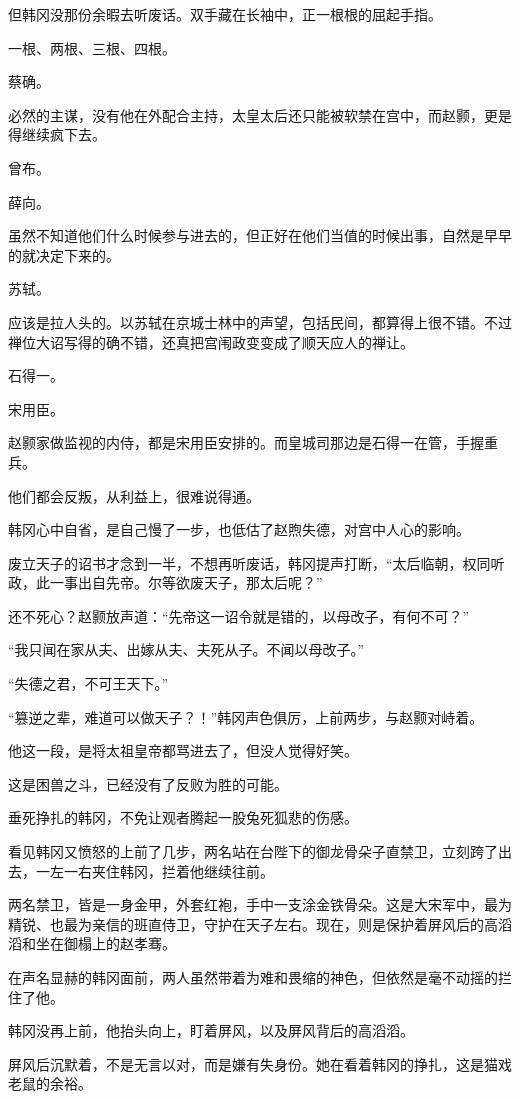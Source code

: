 但韩冈没那份余暇去听废话。双手藏在长袖中，正一根根的屈起手指。

一根、两根、三根、四根。

蔡确。

必然的主谋，没有他在外配合主持，太皇太后还只能被软禁在宫中，而赵颢，更是得继续疯下去。

曾布。

薛向。

虽然不知道他们什么时候参与进去的，但正好在他们当值的时候出事，自然是早早的就决定下来的。

苏轼。

应该是拉人头的。以苏轼在京城士林中的声望，包括民间，都算得上很不错。不过禅位大诏写得的确不错，还真把宫闱政变变成了顺天应人的禅让。

石得一。

宋用臣。

赵颢家做监视的内侍，都是宋用臣安排的。而皇城司那边是石得一在管，手握重兵。

他们都会反叛，从利益上，很难说得通。

韩冈心中自省，是自己慢了一步，也低估了赵煦失德，对宫中人心的影响。

废立天子的诏书才念到一半，不想再听废话，韩冈提声打断，“太后临朝，权同听政，此一事出自先帝。尔等欲废天子，那太后呢？”

还不死心？赵颢放声道：“先帝这一诏令就是错的，以母改子，有何不可？”

“我只闻在家从夫、出嫁从夫、夫死从子。不闻以母改子。”

“失德之君，不可王天下。”

“篡逆之辈，难道可以做天子？！”韩冈声色俱厉，上前两步，与赵颢对峙着。

他这一段，是将太祖皇帝都骂进去了，但没人觉得好笑。

这是困兽之斗，已经没有了反败为胜的可能。

垂死挣扎的韩冈，不免让观者腾起一股兔死狐悲的伤感。

看见韩冈又愤怒的上前了几步，两名站在台陛下的御龙骨朵子直禁卫，立刻跨了出去，一左一右夹住韩冈，拦着他继续往前。

两名禁卫，皆是一身金甲，外套红袍，手中一支涂金铁骨朵。这是大宋军中，最为精锐、也最为亲信的班直侍卫，守护在天子左右。现在，则是保护着屏风后的高滔滔和坐在御榻上的赵孝骞。

在声名显赫的韩冈面前，两人虽然带着为难和畏缩的神色，但依然是毫不动摇的拦住了他。

韩冈没再上前，他抬头向上，盯着屏风，以及屏风背后的高滔滔。

屏风后沉默着，不是无言以对，而是嫌有失身份。她在看着韩冈的挣扎，这是猫戏老鼠的余裕。

